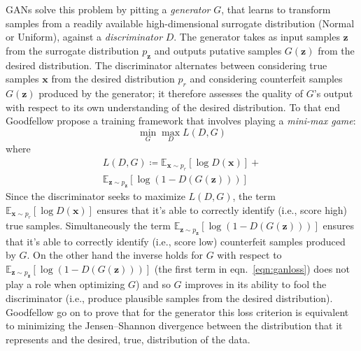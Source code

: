 GANs solve this problem by pitting a \textit{generator} \(G\), that learns to transform samples from a readily available high-dimensional surrogate distribution (Normal or Uniform), against a \textit{discriminator} \(D\).
The generator takes as input samples \(\bm{z}\) from the surrogate distribution \(p_{\bm{z}}\) and outputs putative samples \(G(\bm{z})\) from the desired distribution.
%
The discriminator alternates between considering true samples \(\bm{x}\) from the desired distribution \(p_r\) and considering counterfeit samples \(G(\bm{z})\) produced by the generator; it therefore assesses the quality of \(G\)'s output with respect to its own understanding of the desired distribution.
%
To that end Goodfellow \etal \cite{goodfellow2014generative} propose a training framework that involves playing a \textit{mini-max game}:
\begin{equation}
    \min_G \max_D L(D, G)
\end{equation}
where
\begin{multline}
    L(D, G) \coloneqq \mathbb{E}_{\bm{x} \sim p_{r}} [\log D(\bm{x})] + \\ \mathbb{E}_{\bm{z} \sim p_{\bm{z}} } [\log(1 - D(G(\bm{z})))]
    \label{eqn:ganloss}
\end{multline}
Since the discriminator seeks to maximize \(L(D, G)\), the term \(\mathbb{E}_{\bm{x} \sim p_{r}} [\log D(\bm{x})]\) ensures that it's able to correctly identify (i.e., score high) true samples.
%
Simultaneously the term \(\mathbb{E}_{\bm{z} \sim p_{\bm{z}} } [\log(1 - D(G(\bm{z})))] \) ensures that it's able to correctly identify (i.e., score low) counterfeit samples produced by \(G\).
%
On the other hand the inverse holds for \(G\) with respect to \(\mathbb{E}_{\bm{z} \sim p_{\bm{z}} } [\log(1 - D(G(\bm{z})))]\) (the first term in eqn.~\eqref{eqn:ganloss}) does not play a role when optimizing \(G\)) and so \(G\) improves in its ability to fool the discriminator (i.e., produce plausible samples from the desired distribution).
%
Goodfellow \etal go on to prove that for the generator this loss criterion is equivalent to minimizing the Jensen–Shannon divergence between the distribution that it represents and the desired, true, distribution of the data.
